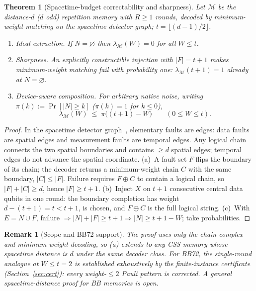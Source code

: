 \documentclass[11pt,a4paper]{article}
\newtheorem{theorem}{Theorem}\newtheorem{lemma}{Lemma}
\newtheorem{remark}{Remark}
\begin{document}
\begin{theorem}[Spacetime-budget correctability and sharpness]\label{thm:spacetime}
Let $\mathcal{M}$ be the distance-$d$ ($d$ odd) repetition memory with
$R\ge1$ rounds, decoded by minimum-weight matching on the spacetime
detector graph; $t=\lfloor(d-1)/2\rfloor$.
\begin{enumerate}[label=(\alph*),leftmargin=1.6em]
\item \emph{Ideal extraction.} If $N=\varnothing$ then
$\lambda_{\mathcal{M}}(W)=0$ for all $W\le t$.
\item \emph{Sharpness.} An explicitly constructible injection with
$|F|=t+1$ makes minimum-weight matching fail with probability one:
$\lambda_{\mathcal{M}}(t+1)=1$ already at $N=\varnothing$.
\item \emph{Device-aware composition.} For arbitrary native noise,
writing $\pi(k):=\Pr[|N|\ge k]$ ($\pi(k)=1$ for $k\le0$),
\[
\lambda_{\mathcal{M}}(W)\;\le\;\pi\bigl((t{+}1)-W\bigr)\qquad(0\le W\le t).
\]
\end{enumerate}
\end{theorem}
\begin{proof}
In the spacetime detector graph~\cite{Dennis2002,Fowler2012},
elementary faults are edges: data
faults are spatial edges and measurement faults are temporal edges.
Any logical chain connects the two spatial boundaries and contains
$\ge d$ spatial edges; temporal edges do not advance the spatial
coordinate. (a)~A fault set $F$ flips the boundary of its chain; the
decoder returns a minimum-weight chain $C$ with the same boundary,
$|C|\le|F|$. Failure requires $F\oplus C$ to contain a logical chain,
so $|F|+|C|\ge d$, hence $|F|\ge t{+}1$. (b)~Inject $X$ on $t{+}1$
consecutive central data qubits in one round: the boundary completion
has weight $d-(t{+}1)=t<t{+}1$, is chosen, and $F\oplus C$ is the full
logical string. (c)~With $E=N\cup F$, failure
$\Rightarrow|N|+|F|\ge t{+}1\Rightarrow|N|\ge t{+}1-W$; take
probabilities.
\end{proof}

\begin{remark}[Scope and BB72 support]
The proof uses only the chain complex and minimum-weight decoding, so
(a) extends to any CSS memory whose spacetime distance is $d$ under the
same decoder class. For BB72, the single-round analogue at $W\le t=2$
is established \emph{exhaustively} by the finite-instance certificate
(Section~\ref{sec:cert}): every weight-$\le2$ Pauli pattern is
corrected. A general spacetime-distance proof for BB memories is open.
\end{remark}
\end{document}
